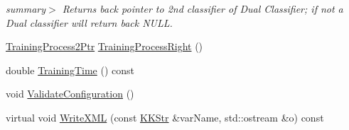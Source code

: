 \begin{DoxyCompactItemize}
\begin{DoxyCompactList}\small\item\em summary$>$ Returns back pointer to 2nd classifier of Dual Classifier; if not a Dual classifier will return back N\+U\+LL. \end{DoxyCompactList}\item 
\hyperlink{class_k_k_m_l_l_1_1_training_process2_a5442e76e1ae2de2e77e3a36b55f98fe4}{Training\+Process2\+Ptr} \hyperlink{class_k_k_m_l_l_1_1_training_process2_a61cd866f5ff9269a4ac8399b46d76919}{Training\+Process\+Right} ()
\item 
double \hyperlink{class_k_k_m_l_l_1_1_training_process2_a3c2b70c8ee5142a84b3bafd5a787d427}{Training\+Time} () const 
\item 
void \hyperlink{class_k_k_m_l_l_1_1_training_process2_a3e2b57b94305808af451fd905e769d5e}{Validate\+Configuration} ()
\item 
virtual void \hyperlink{class_k_k_m_l_l_1_1_training_process2_a35cf9c0ab759e95b140b253b4db53c3b}{Write\+X\+ML} (const \hyperlink{class_k_k_b_1_1_k_k_str}{K\+K\+Str} \&var\+Name, std\+::ostream \&o) const 
\end{DoxyCompactItemize}
